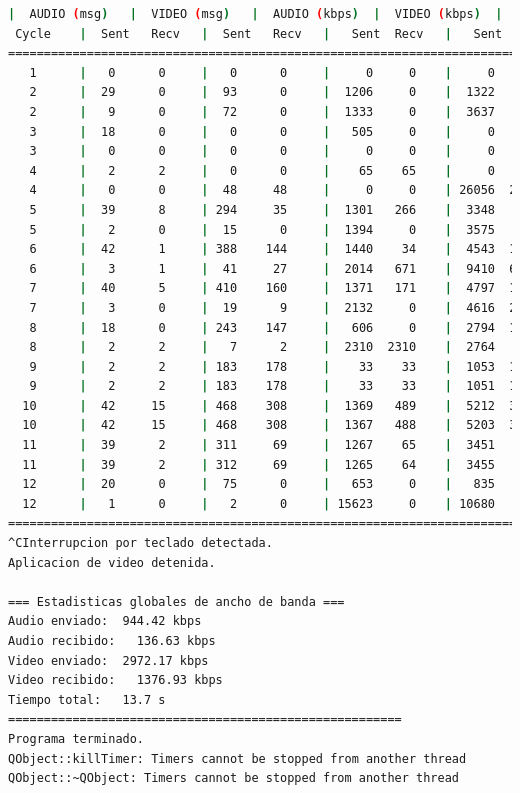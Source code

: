 \begin{lstlisting}[language=bash,basicstyle=\ttfamily\scriptsize]
          |  AUDIO (msg)   |  VIDEO (msg)   |  AUDIO (kbps)  |  VIDEO (kbps)  |   CPU (%)
 Cycle    |  Sent   Recv   |  Sent   Recv   |   Sent  Recv   |   Sent  Recv   | Program System
============================================================================================
   1      |   0      0     |   0      0     |     0     0    |     0     0    |   0      0
   2      |  29      0     |  93      0     |  1206     0    |  1322     0    |  30     74
   2      |   9      0     |  72      0     |  1333     0    |  3637     0    |  27     77
   3      |  18      0     |   0      0     |   505     0    |     0     0    |  31     45
   3      |   0      0     |   0      0     |     0     0    |     0     0    |   0     38
   4      |   2      2     |   0      0     |    65    65    |     0     0    |  41      1
   4      |   0      0     |  48     48     |     0     0    | 26056  26056   |   0      4
   5      |  39      8     | 294     35     |  1301   266    |  3348   397    |  30     86
   5      |   2      0     |  15      0     |  1394     0    |  3575     0    |  21     86
   6      |  42      1     | 388    144     |  1440    34    |  4543  1685    |  16     83
   6      |   3      1     |  41     27     |  2014   671    |  9410  6197    |   0     82
   7      |  40      5     | 410    160     |  1371   171    |  4797  1872    |  16     79
   7      |   3      0     |  19      9     |  2132     0    |  4616  2140    |  21     79
   8      |  18      0     | 243    147     |   606     0    |  2794  1689    |  28     47
   8      |   2      2     |   7      2     |  2310  2310    |  2764   789    |   0     48
   9      |   2      2     | 183    178     |    33    33    |  1053  1026    |  35      5
   9      |   2      2     | 183    178     |    33    33    |  1051  1025    |  35      3
  10      |  42     15     | 468    308     |  1369   489    |  5212  3430    |  37     89
  10      |  42     15     | 468    308     |  1367   488    |  5203  3425    |  37     89
  11      |  39      2     | 311     69     |  1267    65    |  3451   766    |  35     85
  11      |  39      2     | 312     69     |  1265    64    |  3455   765    |  35     85
  12      |  20      0     |  75      0     |   653     0    |   835     0    |  29     45
  12      |   1      0     |   2      0     | 15623     0    | 10680     0    |   0     46
============================================================================================
^CInterrupcion por teclado detectada.
Aplicacion de video detenida.

=== Estadisticas globales de ancho de banda ===
Audio enviado:	944.42 kbps
Audio recibido:   136.63 kbps
Video enviado:	2972.17 kbps
Video recibido:   1376.93 kbps
Tiempo total: 	13.7 s
=======================================================
Programa terminado.
QObject::killTimer: Timers cannot be stopped from another thread
QObject::~QObject: Timers cannot be stopped from another thread
\end{lstlisting}

